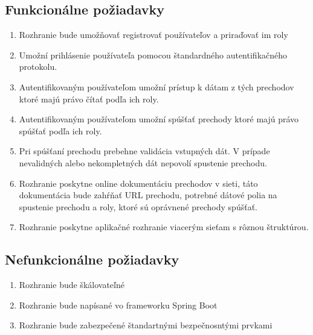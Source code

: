   

\subsection{Funkcionálne požiadavky} 

\begin{enumerate} 

    \item Rozhranie bude umožňovať registrovať používateľov a priraďovať im roly 

    \item Umožní prihlásenie používateľa pomocou štandardného autentifikačného protokolu. 

    \item Autentifikovaným používateľom umožní prístup k dátam z tých prechodov ktoré majú právo čítať podľa ich roly. 

    \item Autentifikovaným používateľom umožní spúšťať prechody ktoré majú právo spúšťať podľa ich roly. 

    \item Pri spúšťaní prechodu prebehne validácia vstupných dát. V prípade nevalidných alebo nekompletných dát nepovolí spustenie prechodu. 

    \item Rozhranie poskytne online dokumentáciu prechodov v sieti, táto dokumentácia bude zahŕňať URL prechodu, potrebné dátové polia na spustenie prechodu a roly, ktoré sú oprávnené prechody spúšťať. 

    \item Rozhranie poskytne aplikačné rozhranie viacerým sieťam s rôznou štruktúrou. 

\end{enumerate}     

  

 
  

\subsection{Nefunkcionálne požiadavky} 

\begin{enumerate} 

    \item Rozhranie bude škálovateľné 
    \item Rozhranie bude napísané vo frameworku Spring Boot 
    \item Rozhranie bude zabezpečené štandartnými bezpečnosntými prvkami
	
\end{enumerate} 

